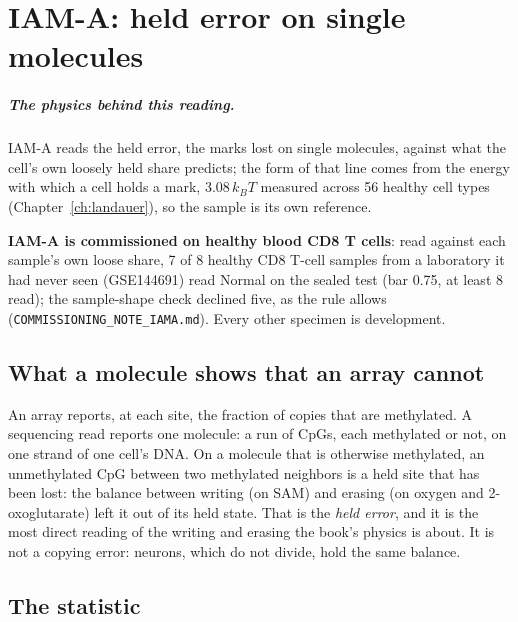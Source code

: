\chapter{IAM-A: held error on single molecules}\label{ch:iama}

\paragraph{The physics behind this reading.} IAM-A reads the held error, the marks lost on single molecules, against what the cell's own loosely held share predicts; the form of that line comes from the energy with which a cell holds a mark, 3.08\,$k_BT$ measured across 56 healthy cell types (Chapter~\ref{ch:landauer}), so the sample is its own reference.


\textbf{IAM-A is commissioned on healthy blood CD8 T cells}: read against each sample's own loose share, 7 of 8 healthy CD8 T-cell samples from a laboratory it had never seen (GSE144691) read Normal on the sealed test (bar 0.75, at least 8 read); the sample-shape check declined five, as the rule allows (\texttt{COMMISSIONING\_NOTE\_IAMA.md}). Every other specimen is development. \measured

\section{What a molecule shows that an array cannot}

An array reports, at each site, the fraction of copies that are methylated. A sequencing read reports one molecule: a run of
CpGs, each methylated or not, on one strand of one cell's DNA. On a molecule that is otherwise methylated, an unmethylated CpG
between two methylated neighbors is a held site that has been lost: the balance between writing (on SAM) and erasing (on oxygen and
2-oxoglutarate) left it out of its held state. That is the \emph{held error}, and it is the most direct reading of the writing and erasing
the book's physics is about. It is not a copying error: neurons, which do not divide, hold the same balance.

\section{The statistic}

